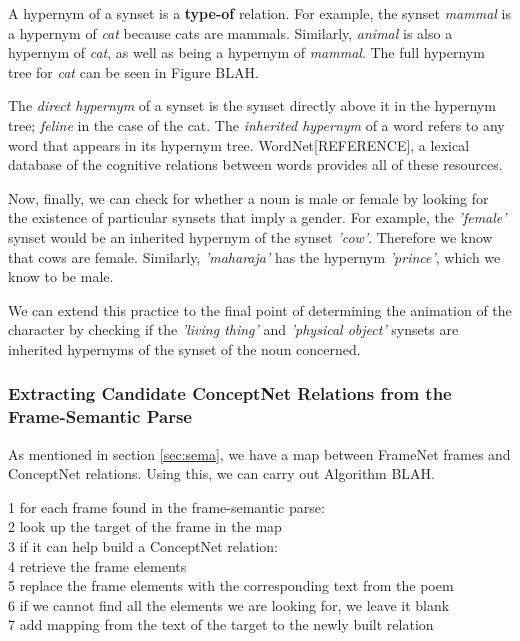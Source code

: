 A hypernym of a synset is a \textbf{type-of} relation. For example, the synset \textit{mammal} is a hypernym of \textit{cat} because cats are mammals. Similarly, \textit{animal} is also a hypernym of \textit{cat}, as well as being a hypernym of \textit{mammal}. The full hypernym tree for \textit{cat} can be seen in Figure BLAH. 

The \textit{direct hypernym} of a synset is the synset directly above it in the hypernym tree; \textit{feline} in the case of the cat. The \textit{inherited hypernym} of a word refers to any word that appears in its hypernym tree. WordNet[REFERENCE], a lexical database of the cognitive relations between words provides all of these resources.

Now, finally, we can check for whether a noun is male or female by looking for the existence of particular synsets that imply a gender. For example, the \textit{'female'} synset would be an inherited hypernym of the synset \textit{'cow'}. Therefore we know that cows are female. Similarly, \textit{'maharaja'} has the hypernym \textit{'prince'}, which we know to be male.

We can extend this practice to the final point of determining the animation of the character by checking if the \textit{'living thing'} and \textit{'physical object'} synsets are inherited hypernyms of the synset of the noun concerned.


\subsubsection{Extracting Candidate ConceptNet Relations from the Frame-Semantic Parse}
\label{sec:candidate}

As mentioned in section \ref{sec:sema}, we have a map between FrameNet frames and ConceptNet relations. Using this, we can carry out Algorithm BLAH.

1 for each frame found in the frame-semantic parse:\\
2	look up the target of the frame in the map\\
3	if it can help build a ConceptNet relation:	\\
4		retrieve the frame elements\\
5		replace the frame elements with the corresponding text from the poem\\
6			if we cannot find all the elements we are looking for, we leave it blank\\
7		add mapping from the text of the target to the newly built relation\\
	
